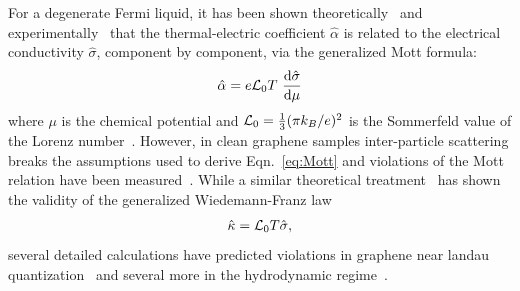For a degenerate Fermi liquid, it has been shown theoretically~\cite{smrcka_transport_1977} and experimentally~\cite{zuev_thermoelectric_2009} that the thermal-electric coefficient $\hat\alpha$ is related to the electrical conductivity $\hat\sigma$, component by component, via the generalized Mott formula:
\begin{equation}\label{eq:Mott}
\hat\alpha = e\mathcal{L}_0T~\frac{\mathrm{d}\hat\sigma}{\mathrm{d}\mu}
\end{equation}
where $\mu$ is the chemical potential and $\mathcal{L}_0= \frac{1}{3}(\pi k_B/e)^2$ is the Sommerfeld value of the Lorenz number~\cite{sommerfeld_zur_1927}. However, in clean graphene samples inter-particle scattering breaks the assumptions used to derive Eqn.~\ref{eq:Mott} and violations of the Mott relation have been measured~\cite{ghahari_enhanced_2016}.
While a similar theoretical treatment~\cite{smrcka_transport_1977} has shown the validity of the generalized Wiedemann-Franz law 
\begin{equation}\label{eq:WF_gen}
\hat\kappa = \mathcal{L}_0 T\hat\sigma,
\end{equation}
several detailed calculations have predicted violations in graphene near landau quantization~\cite{dora_magnetotransport_2007, long_quantum_2011, gusynin_magnetic_2005} and several more in the hydrodynamic regime~\cite{muller_quantum-critical_2008, muller_collective_2008}.

